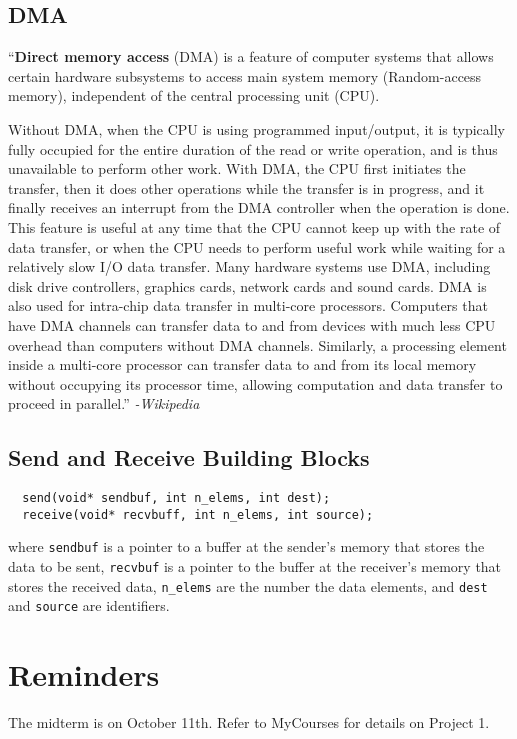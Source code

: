 \documentclass{math}
\begin{document}
\subsection*{DMA}
``\textbf{Direct memory access} (DMA) is a feature of computer systems that
allows certain hardware subsystems to access main system memory (Random-access
memory), independent of the central processing unit (CPU). \par
Without DMA, when the CPU is using programmed input/output, it is typically
fully occupied for the entire duration of the read or write operation, and is
thus unavailable to perform other work. With DMA, the CPU first initiates the
transfer, then it does other operations while the transfer is in progress, and
it finally receives an interrupt from the DMA controller when the operation is
done. This feature is useful at any time that the CPU cannot keep up with the
rate of data transfer, or when the CPU needs to perform useful work while
waiting for a relatively slow I/O data transfer. Many hardware systems use
DMA, including disk drive controllers, graphics cards, network cards and
sound cards. DMA is also used for intra-chip data transfer in multi-core
processors. Computers that have DMA channels can transfer data to and from
devices with much less CPU overhead than computers without DMA channels.
Similarly, a processing element inside a multi-core processor can transfer
data to and from its local memory without occupying its processor time,
allowing computation and data transfer to proceed in parallel.''
\textit{-Wikipedia}

\subsection*{Send and Receive Building Blocks}
\begin{lstlisting}
  send(void* sendbuf, int n_elems, int dest);
  receive(void* recvbuff, int n_elems, int source);
\end{lstlisting}
where \texttt{sendbuf} is a pointer to a buffer at the sender's memory that
stores the data to be sent, \texttt{recvbuf} is a pointer to the buffer at
the receiver's memory that stores the received data, \texttt{n\_elems} are
the number the data elements, and \texttt{dest} and \texttt{source} are
identifiers.

\section*{Reminders}
The midterm is on October 11th.
Refer to MyCourses for details on Project 1. \\
\end{document}
